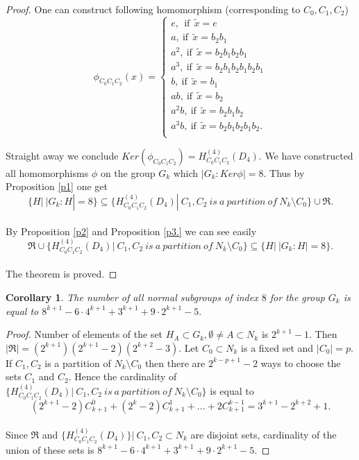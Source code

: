 \documentclass[12pt,reqno]{amsart}
\newtheorem{cor}{Corollary}
\numberwithin{equation}{section}
\begin{document}
\begin{proof}
One can construct following homomorphism (corresponding to $C_{0},
C_{1}, C_{2}$)\\
$$\phi_{C_{0} C_{1}
C_{2}}(x)=\left\{\begin{array}{ll}
e, \ \ \mbox{if} \ \ \tilde{x}=e\\[2.5mm]
a, \ \mbox{if}\ \ \tilde{x}=b_{2}b_{1} \\[2.5mm]
a^{2}, \ \mbox{if} \ \ \tilde{x}=b_{2}b_{1}b_{2}b_{1} \\[2.5mm]
a^{3}, \ \mbox{if} \ \ \tilde{x}=b_{2}b_{1}b_{2}b_{1}b_{2}b_{1}\\[2.5mm]
b, \ \mbox{if}\ \ \tilde{x}=b_{1} \\[2.5mm]
ab, \ \mbox{if}\ \ \tilde{x}=b_{2} \\[2.5mm]
a^{2}b, \ \mbox{if}\ \ \tilde{x}=b_{2}b_{1}b_{2} \\[2.5mm]
a^{3}b, \ \mbox{if}\ \ \tilde{x}=b_{2}b_{1}b_{2}b_{1}b_{2}. \\
\end{array}\right.$$

Straight away we conclude $Ker(\phi_{C_{0} C_{1}
C_{2}})=H^{(4)}_{C_{0} C_{1} C_{2}}(D_{4}).$ We have constructed
all homomorphisms $\phi$ on the group $G_{k}$ which
$|G_{k}:Ker\phi|=8.$ Thus by Proposition \ref{p1} one get\\
 $$\{H|\ |G_{k}:H|=8\}\subseteq \{H^{(4)}_{C_{0}C_{1}C_{2}}(D_{4})|\
C_{1},C_{2}\ is\ a\ partition\ of\ N_{k}\setminus C_{0}\} \cup
\Re.$$\\
 By Proposition \ref{p2} and Proposition \ref{p3.} we can see
 easily\\
$$\Re \cup \{H^{(4)}_{C_{0}C_{1}C_{2}}(D_{4})|\ C_{1},C_{2}\
is\ a\ partition\ of\ N_{k}\setminus C_{0}\}\subseteq \{H|\
|G_{k}:H|=8\}.$$\\
 The theorem is proved.
 \end{proof}

\begin{cor}\label{c1} The number of all normal subgroups of index
$8$ for the group $G_{k}$ is equal to
$8^{k+1}-6\cdot4^{k+1}+3^{k+1}+9\cdot2^{k+1}-5.$
\end{cor}

\begin{proof} Number of elements of the set $H_{A}\subset G_{k}, \emptyset \neq A\subset
N_{k}$ is $2^{k+1}-1.$ Then
$|\Re|=(2^{k+1})(2^{k+1}-2)(2^{k+2}-3).$ Let $C_{0}\subset N_{k}$
is a fixed set and $|C_{0}|=p.$ If $C_{1}, C_{2}$ is a partition
of $N_{k}\setminus C_{0}$ then there are $2^{k-p+1}-2$ ways to
choose the sets $C_{1}$ and $C_{2}.$ Hence the cardinality of
$\{H^{(4)}_{C_{0}C_{1}C_{2}}(D_{4})|\ C_{1},C_{2}\ is\ a\
partition\ of\ N_{k}\setminus C_{0}\}$ is equal to\\
$$(2^{k+1}-2)C^{0}_{k+1}+(2^{k}-2)C_{k+1}^{1}+...+2C_{k+1}^{k-1}=3^{k+1}-2^{k+2}+1.$$\\
Since $\Re$ and $\{H^{(4)}_{C_{0}C_{1}C_{2}}(D_{4})\}|\
C_{1},C_{2}\subset N_{k}$ are disjoint sets, cardinality of the
union of these sets is
$8^{k+1}-6\cdot4^{k+1}+3^{k+1}+9\cdot2^{k+1}-5.$

\end{proof}
\end{document}
